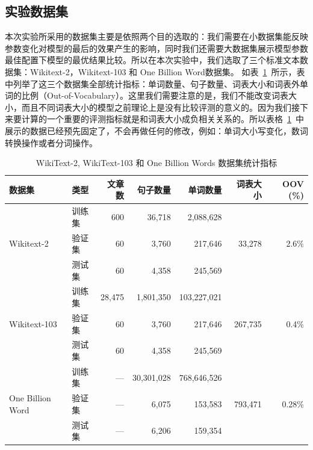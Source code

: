 \subsection{实验数据集}
本次实验所采用的数据集主要是依照两个目的选取的：我们需要在小数据集能反映参数变化对模型的最后的效果产生的影响，同时我们还需要大数据集展示模型参数最佳配置下模型的最优结果比较。所以在本次实验中，我们选取了三个标准文本数据集：Wikitext-2，Wikitext-103 和 One Billion Word数据集。
如表~\ref{tab:dataset}~所示，表中列举了这三个数据集全部统计指标：单词数量、句子数量、词表大小和词表外单词的比例（Out-of-Vocabulary）。这里我们需要注意的是，我们不能改变词表大小，而且不同词表大小的模型之前理论上是没有比较评测的意义的。因为我们接下来要计算的一个重要的评测指标就是和词表大小成负相关关系的。所以表格~\ref{tab:dataset}~中展示的数据已经预先固定了，不会再做任何的修改，例如：单词大小写变化，数词转换操作或者分词操作。
\begin{table}
  \centering
  \caption{WikiText-2, WikiText-103 和 One Billion Words 数据集统计指标 \label{tab:dataset}}
\begin{tabular}{llrrrrr}
\toprule
数据集& 类型& 文章数 & 句子数量 &  单词数量 &词表大小 & OOV (\%) \\ \midrule
\multirow{3}{*}{Wikitext-2} &训练集& 600 & 36,718 & 2,088,628 & \multirow{3}{*}{33,278} & \multirow{3}{*}{2.6\%} \\
&验证集& 60 &3,760 & 217,646  & &\\
&测试集& 60 & 4,358 & 245,569 & &\\
\midrule
\multirow{3}{*}{Wikitext-103} &训练集& 28,475 &  1,801,350 &  103,227,021 & \multirow{3}{*}{267,735} & \multirow{3}{*}{0.4\%} \\
&验证集& 60 &3,760 & 217,646  & &\\
&测试集& 60 & 4,358 & 245,569 & &\\
\midrule
\multirow{3}{*}{One Billion Word} &训练集& --- &30,301,028&768,646,526&   \multirow{3}{*}{793,471} &   \multirow{3}{*}{0.28\%} \\
 &验证集& --- &  6,075 &   153,583 &&\\
 &测试集 & --- &  6,206 &   159,354 &&\\
\bottomrule
\end{tabular}
\end{table}

